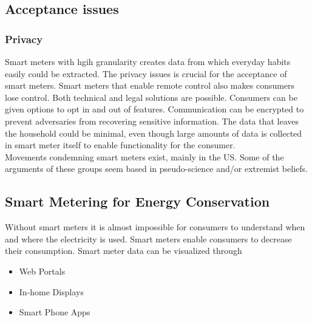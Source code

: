 \subsection{Acceptance issues}

\subsubsection{Privacy}
Smart meters with hgih granularity creates data from which everyday habits easily could be extracted.
The privacy issues is crucial for the acceptance of smart meters.
Smart meters that enable remote control also makes consumers lose control.
Both technical and legal solutions are possible.
Consumers can be given options to opt in and out of features.
Communication can be encrypted to prevent adversaries from recovering sensitive information.
The data that leaves the household could be minimal, even though large amounts of data is collected in smart meter itself to enable functionality for the consumer.\\

Movements condemning smart meters exist, mainly in the US.
Some of the arguments of these groups seem based in pseudo-science and/or extremist beliefs.

\subsection{Smart Metering for Energy Conservation}
Without smart meters it is almost impossible for consumers to understand when and where the electricity is used. Smart meters enable consumers to decrease their consumption.
Smart meter data can be visualized through
\begin{itemize}
    \item Web Portals
    \item In-home Displays
    \item Smart Phone Apps
\end{itemize}

